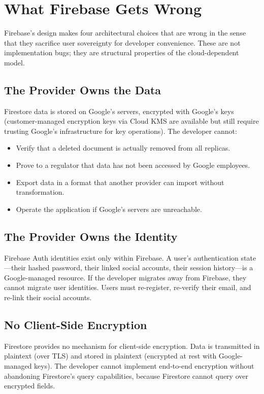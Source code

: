 \documentclass[11pt,a4paper]{article}
\begin{document}
\section{What Firebase Gets Wrong}\label{sec:wrong}

Firebase's design makes four architectural choices that are wrong in
the sense that they sacrifice user sovereignty for developer convenience.
These are not implementation bugs; they are structural properties of
the cloud-dependent model.

\subsection{The Provider Owns the Data}

Firestore data is stored on Google's servers, encrypted with Google's
keys (customer-managed encryption keys via Cloud KMS are available but
still require trusting Google's infrastructure for key operations). The
developer cannot:

\begin{itemize}
    \item Verify that a deleted document is actually removed from all replicas.
    \item Prove to a regulator that data has not been accessed by Google employees.
    \item Export data in a format that another provider can import without transformation.
    \item Operate the application if Google's servers are unreachable.
\end{itemize}

\subsection{The Provider Owns the Identity}

Firebase Auth identities exist only within Firebase. A user's
authentication state---their hashed password, their linked social
accounts, their session history---is a Google-managed resource. If the
developer migrates away from Firebase, they cannot migrate user identities.
Users must re-register, re-verify their email, and re-link their social
accounts.

\subsection{No Client-Side Encryption}

Firestore provides no mechanism for client-side encryption. Data is
transmitted in plaintext (over TLS) and stored in plaintext (encrypted
at rest with Google-managed keys). The developer cannot implement
end-to-end encryption without abandoning Firestore's query capabilities,
because Firestore cannot query over encrypted fields.
\end{document}
